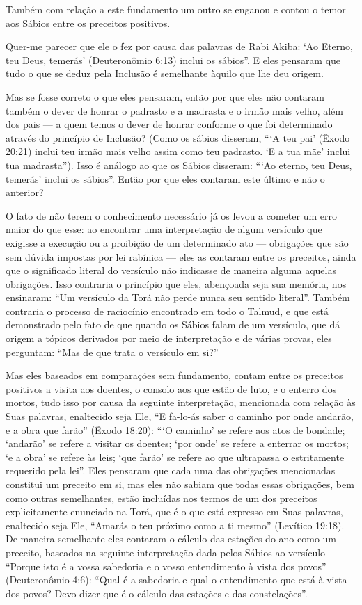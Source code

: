 Também com relação a este fundamento um outro se enganou e contou o
temor aos Sábios entre os preceitos positivos.

Quer-me parecer que ele o fez por causa das palavras de Rabi Akiba: `Ao
Eterno, teu Deus, temerás' (Deuteronômio 6:13) inclui os sábios''. E
eles pensaram que tudo o que se deduz pela Inclusão é semelhante àquilo
que lhe deu origem.

Mas se fosse correto o que eles pensaram, então por que eles não
contaram também o dever de honrar o padrasto e a madrasta e o irmão mais
velho, além dos pais --- a quem temos o dever de honrar conforme o que
foi determinado através do princípio de Inclusão? (Como os sábios
disseram, ```A teu pai' (Êxodo 20:21) inclui teu irmão mais velho assim
como teu padrasto. `E a tua mãe' inclui tua madrasta''). Isso é análogo
ao que os Sábios disseram: ```Ao eterno, teu Deus, temerás' inclui os
sábios''. Então por que eles contaram este último e não o anterior?

O fato de não terem o conhecimento necessário já os levou a cometer um
erro maior do que esse: ao encontrar uma interpretação de algum
versículo que exigisse a execução ou a proibição de um determinado ato
--- obrigações que são sem dúvida impostas por lei rabínica --- eles as
contaram entre os preceitos, ainda que o significado literal do
versículo não indicasse de maneira alguma aquelas obrigações. Isso
contraria o princípio que eles, abençoada seja sua memória, nos
ensinaram: ``Um versículo da Torá não perde nunca seu sentido
literal''. Também contraria o processo de raciocínio encontrado em todo
o Talmud, e que está demonstrado pelo fato de que quando os Sábios falam
de um versículo, que dá origem a tópicos derivados por meio de
interpretação e de várias provas, eles perguntam: ``Mas de que trata o
versículo em si?''

Mas eles baseados em comparações sem fundamento, contam entre os
preceitos positivos a visita aos doentes, o consolo aos que estão de
luto, e o enterro dos mortos, tudo isso por causa da seguinte
interpretação, mencionada com relação às Suas palavras, enaltecido seja
Ele, ``E fa-lo-ás saber o caminho por onde andarão, e a obra que
farão'' (Êxodo 18:20): ```O caminho' se refere aos atos de bondade;
`andarão' se refere a visitar os doentes; `por onde' se refere a
enterrar os mortos; `e a obra' se refere às leis; `que farão' se refere
ao que ultrapassa o estritamente requerido pela lei''. Eles pensaram que
cada uma das obrigações mencionadas constitui um preceito em si, mas
eles não sabiam que todas essas obrigações, bem como outras
semelhantes, estão incluídas nos termos de um dos preceitos
explicitamente enunciado na Torá, que é o que está expresso em Suas
palavras, enaltecido seja Ele, ``Amarás o teu próximo como a ti mesmo''
(Levítico 19:18). De maneira semelhante eles contaram o cálculo das
estações do ano como um preceito, baseados na seguinte interpretação
dada pelos Sábios ao versículo ``Porque isto é a vossa sabedoria e o
vosso entendimento à vista dos povos'' (Deuteronômio 4:6): ``Qual é a
sabedoria e qual o entendimento que está à vista dos povos? Devo dizer
que é o cálculo das estações e das constelações''.


